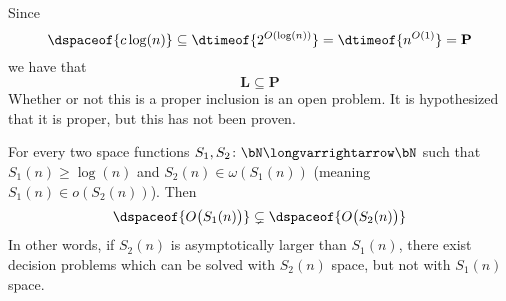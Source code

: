 \documentclass[10pt]{article}
\let\longto=\longvarrightarrow
\def\P{\mathbf{P}}
\def\L{\mathbf{L}}
\begin{document}
Since
\[ \dspaceof{c\log(n)} \subseteq \dtimeof{2^{O(\log(n))}} = \dtimeof{n^{O(1)}} = \P \]
we have that
\[ \L \subseteq \P \]
Whether or not this is a proper inclusion is an open problem.
It is hypothesized that it is proper, but this has not been proven.

\begin{thrm*}

    For every two space functions $S_1,S_2\colon\bN\longto\bN$ such that $S_1(n)\geq\log(n)$ and $S_2(n)\in\omega(S_1(n))$ (meaning $S_1(n)\in o(S_2(n))$).
    Then
    \[ \dspaceof{O\bigl(S_1(n)\bigr)} \subsetneq \dspaceof{O\bigl(S_2(n)\bigr)} \]
    In other words, if $S_2(n)$ is asymptotically larger than $S_1(n)$, there exist decision problems which can be solved with $S_2(n)$ space, but not with $S_1(n)$ space.

\end{thrm*}
\end{document}

